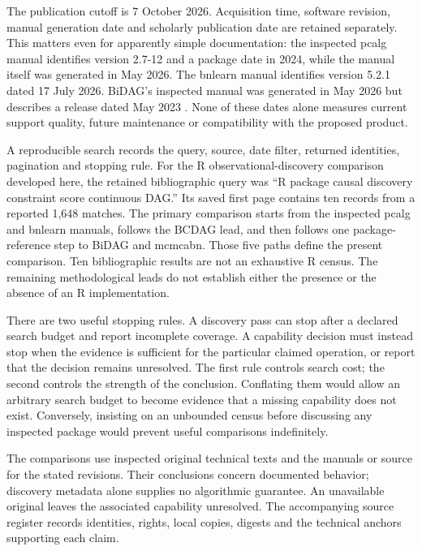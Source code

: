 The publication cutoff is 7 October 2026. Acquisition time, software revision,
manual generation date and scholarly publication date are retained separately.
This matters even for apparently simple documentation: the inspected pcalg
manual identifies version 2.7-12 and a package date in 2024, while the manual
itself was generated in May 2026. The bnlearn manual identifies version 5.2.1
dated 17 July 2026. BiDAG's inspected manual was generated in May 2026 but
describes a release dated May 2023
\citep{exec13_pcalg,exec13_bnlearn,exec13_bidag}. None of these dates alone
measures current support quality, future maintenance or compatibility with
the proposed product.

A reproducible search records the query, source, date filter, returned
identities, pagination and stopping rule. For the R observational-discovery
comparison developed here, the retained bibliographic query was ``R package
causal discovery constraint score continuous DAG.'' Its saved first page
contains ten records from a reported 1,648 matches. The primary comparison
starts from the inspected pcalg and bnlearn manuals, follows the BCDAG lead,
and then follows one package-reference step to BiDAG and mcmcabn. Those five
paths define the present comparison. Ten bibliographic results are not an
exhaustive R census. The remaining methodological leads do not establish
either the presence or the absence of an R implementation.

There are two useful stopping rules. A discovery pass can stop after a
declared search budget and report incomplete coverage. A capability decision
must instead stop when the evidence is sufficient for the particular claimed
operation, or report that the decision remains unresolved. The first rule
controls search cost; the second controls the strength of the conclusion.
Conflating them would allow an arbitrary search budget to become evidence
that a missing capability does not exist. Conversely, insisting on an
unbounded census before discussing any inspected package would prevent useful
comparisons indefinitely.

The comparisons use inspected original technical texts and the manuals or
source for the stated revisions. Their conclusions concern documented
behavior; discovery metadata alone supplies no algorithmic guarantee. An
unavailable original leaves the associated capability unresolved. The
accompanying source register records identities, rights, local copies,
digests and the technical anchors supporting each claim.

